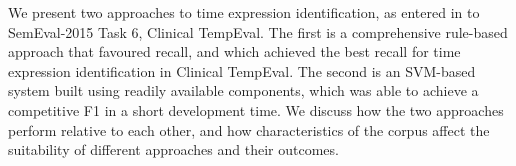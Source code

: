 We present two approaches to time expression identification, as entered in to SemEval-2015 Task 6, Clinical TempEval. The first is a comprehensive rule-based approach that favoured recall, and which achieved the best recall for time expression identification in Clinical TempEval. The second is an SVM-based system built using readily available components, which was able to achieve a competitive F1 in a short development time. We discuss how the two approaches perform relative to each other, and how characteristics of the corpus affect the suitability of different approaches and their outcomes.
